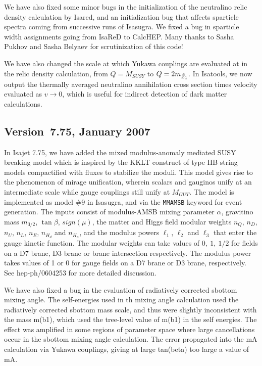 We have also fixed some minor bugs in the initialization of the neutralino relic density 
calculation by Isared, and an initialization bug that affects sparticle spectra 
coming from successive runs of Isasugra.
We fixed a bug in sparticle width assignments going from IsaReD to CalcHEP.
Many thanks to Sasha Pukhov and Sasha Belyaev for scrutinization of this code!

We have also changed the scale at which Yukawa couplings are evaluated at in the relic 
density calculation, from $Q=M_{SUSY}$ to $Q=2m_{\tilde Z_1}$. In Isatools, we now output
the thermally averaged neutralino annihilation cross section times velocity evaluated 
as $v\rightarrow 0$, which is useful for indirect detection of dark matter calculations.

\subsection{Version~7.75, January 2007}

In Isajet 7.75, we have added the mixed modulus-anomaly mediated
SUSY breaking model which is inspired by the KKLT construct of
type IIB string models compactified with fluxes to stabilize the moduli.
This model gives rise to the phenomenon of mirage unification, wherein
scalars and gauginos unify at an intermediate scale while gauge couplings still
unify at $M_{GUT}$. The model is implemented as model $\#9$ in Isasugra,
and via the \verb|MMAMSB| keyword for event generation. The inputs consist
of modulus-AMSB mixing parameter $\alpha$, gravitino mass $m_{3/2}$,
$\tan\beta$, $sign(\mu )$, the matter and Higgs field modular weights
$n_Q$, $n_D$, $n_U$, $n_L$, $n_E$, $n_{H_d}$ and $n_{H_u}$, and the
modulus powers $\ell_1$, $\ell_2$ and $\ell_3$ that enter the 
gauge kinetic function. The modular weights can take values of
$0,\ 1,\ {1/2}$ for fields on a D7 brane, D3 brane or brane intersection
respectively. The modulus power takes values of 1 or 0 for gauge fields
on a D7 brane or D3 brane, respectively. See hep-ph/0604253 for more
detailed discussion.

We have also fixed a bug in the evaluation of radiatively corrected 
sbottom mixing angle. The self-energies used in th mixing angle calculation
used the radiatively corrected sbottom mass scale, and thus were slightly
inconsistent with the mass m(b1), which used the tree-level value of
m(b1) in the self energies. The effect was amplified in some 
regions of parameter space where large cancellations occur in the 
sbottom mixing angle calculation. The error propagated into the mA calculation 
via Yukawa couplings, giving at large tan(beta) too large a value of mA.


